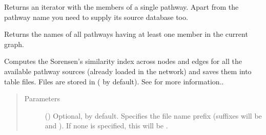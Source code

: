 \documentclass[letterpaper,10pt,english]{sphinxmanual}
\begin{document}
\begin{fulllineitems}
\begin{fulllineitems}
\begin{description}
\end{description}

\end{fulllineitems}


\begin{fulllineitems}
\label{\detokenize{main:pypath.main.PyPath.pathway_attributes}}
\end{fulllineitems}


\begin{fulllineitems}
\label{\detokenize{main:pypath.main.PyPath.pathway_members}}
Returns an iterator with the members of a single pathway.
Apart from the pathway name you need to supply its source
database too.

\end{fulllineitems}


\begin{fulllineitems}
\label{\detokenize{main:pypath.main.PyPath.pathway_names}}
Returns the names of all pathways having at least one member
in the current graph.

\end{fulllineitems}


\begin{fulllineitems}
\label{\detokenize{main:pypath.main.PyPath.pathway_similarity}}
Computes the Sorensen’s similarity index across nodes and edges
for all the available pathway sources (already loaded in the
network) and saves them into table files. Files are stored in
 ( by default).
See {\hyperref[\detokenize{main:pypath.main.PyPath.sorensen_pathways}]{}} for more
information..
\begin{quote}\begin{description}
\item[{Parameters}] \leavevmode
{} () \textendash{} Optional,  by default. Specifies the file name
prefix (suffixes will be  and ). If
none is specified, this will be
.


\end{description}
\end{quote}
\end{fulllineitems}
\end{fulllineitems}
\end{document}
